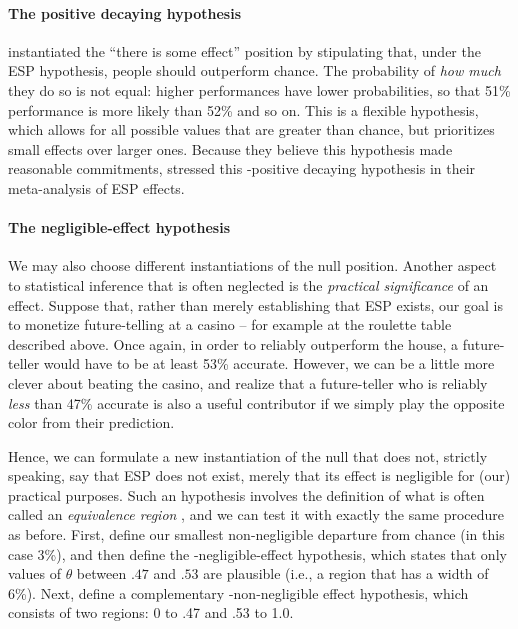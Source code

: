 \paragraph{The positive decaying hypothesis}  instantiated the ``there is some effect'' position by stipulating that, under the ESP hypothesis, people should outperform chance.  The probability of \emph{how much} they do so is not equal: higher performances have lower probabilities, so that 51\% performance is more likely than 52\% and so on.  This is a flexible hypothesis, which allows for all possible values that are greater than chance, but prioritizes small effects over larger ones.  Because they believe this hypothesis made reasonable commitments,  stressed this \hyp{positive decaying hypothesis} in their meta-analysis of ESP effects.


\paragraph{The negligible-effect hypothesis}
We may also choose different instantiations of the null position.  Another aspect to statistical inference that is often neglected is the \emph{practical significance} of an effect. Suppose that, rather than merely establishing that ESP exists, our goal is to monetize future-telling at a casino -- for example at the roulette table described above.  Once again, in order to reliably outperform the house, a future-teller would have to be at least 53\% accurate.  However, we can be a little more clever about beating the casino, and realize that a future-teller who is reliably \emph{less} than 47\% accurate is also a useful contributor if we simply play the opposite color from their prediction.

Hence, we can formulate a new instantiation of the null that does not, strictly speaking, say that ESP does not exist, merely that its effect is negligible for (our) practical purposes.  Such an hypothesis involves the definition of what is often called an \emph{equivalence region} \cite{Rogers:etal:1993}, and we can test it with exactly the same procedure as before. First, define our smallest non-negligible departure from chance (in this case 3\%), and then define the \hyp{negligible-effect hypothesis}, which states that only values of $\theta$ between $.47$ and $.53$ are plausible (i.e., a region that has a width of 6\%). Next, define a complementary \hyp{non-negligible effect hypothesis}, which consists of two regions: 0 to .47 and .53 to 1.0. 


